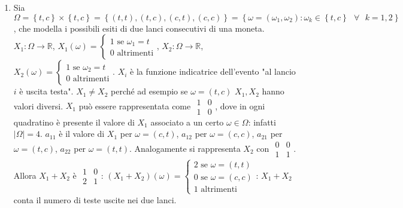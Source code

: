 \documentclass{article}
\begin{document}
\begin{enumerate}
\item Sia $\Omega =\left\{ t,c\right\} \times \left\{ t,c\right\} =\left\{
\left( t,t\right) ,\left( t,c\right) ,\left( c,t\right) ,\left( c,c\right)
\right\} =\left\{ \omega =\left( \omega _{1},\omega _{2}\right) :\omega
_{k}\in \left\{ t,c\right\} \text{ }\forall \text{ }k=1,2\right\} $, che
modella i possibili esiti di due lanci consecutivi di una moneta. $%
X_{1}:\Omega \rightarrow 
\mathbb{R}
$, $X_{1}\left( \omega \right) =\left\{ 
\begin{array}{c}
1\text{ se }\omega _{1}=t \\ 
0\text{ altrimenti}%
\end{array}%
\right. $, $X_{2}:\Omega \rightarrow 
\mathbb{R}
$, $X_{2}\left( \omega \right) =\left\{ 
\begin{array}{c}
1\text{ se }\omega _{2}=t \\ 
0\text{ altrimenti}%
\end{array}%
\right. $. $X_{i}$ \`{e} la funzione indicatrice dell'evento "al lancio $i$ 
\`{e} uscita testa". $X_{1}\neq X_{2}$ perch\'{e} ad esempio se $\omega
=\left( t,c\right) $ $X_{1},X_{2}$ hanno valori diversi. $X_{1}$ pu\`{o}
essere rappresentata come $%
\begin{array}{cc}
1 & 0 \\ 
1 & 0%
\end{array}%
$, dove in ogni quadratino \`{e} presente il valore di $X_{1}$ associato a
un certo $\omega \in \Omega $: infatti $\left\vert \Omega \right\vert =4$. $%
a_{11}$ \`{e} il valore di $X_{1}$ per $\omega =\left( c,t\right) $, $a_{12}$
per $\omega =\left( c,c\right) $, $a_{21}$ per $\omega =\left( t,c\right) $, 
$a_{22}$ per $\omega =\left( t,t\right) $. Analogamente si rappresenta $%
X_{2} $ con $%
\begin{array}{cc}
0 & 0 \\ 
1 & 1%
\end{array}%
$. Allora $X_{1}+X_{2}$ \`{e} $%
\begin{array}{cc}
1 & 0 \\ 
2 & 1%
\end{array}%
$: $\left( X_{1}+X_{2}\right) \left( \omega \right) =\left\{ 
\begin{array}{c}
2\text{ se }\omega =\left( t,t\right) \\ 
0\text{ se }\omega =\left( c,c\right) \\ 
1\text{ altrimenti}%
\end{array}%
\right. $: $X_{1}+X_{2}$ conta il numero di teste uscite nei due lanci.


\end{enumerate}
\end{document}
